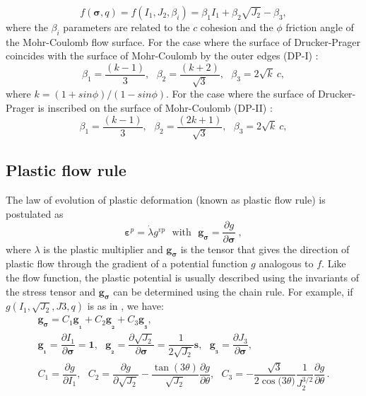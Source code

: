 \documentclass[Journal,letterpaper]{ascelike-new}
\newcommand{\dgds}{\boldsymbol{g_\sigma}}
\newcommand{\gvp}{g^{vp}}
\newcommand{\gllum}{\boldsymbol {g_{_1}}}
\newcommand{\glldois}{\boldsymbol {g_{_2}}}
\newcommand{\glltres}{\boldsymbol {g_{_3}}}
\newcommand{\onell}{\boldsymbol{1}}
\newcommand{\sll}{\boldsymbol{s}}
\newcommand{\strainp}{\boldsymbol{\varepsilon}^{p}}
\newcommand{\stress}{\boldsymbol{\sigma}}
\begin{document}
\begin{equation}
	\label{eq:f_Drucker_Prager}
	f(\stress,q) = f(I_1,J_2,\beta_i) = \beta_1 I_1 +\beta_2 \sqrt{J_2}-\beta_3,
\end{equation}
where the $\beta_i$ parameters are related to the $c$ cohesion and the $\phi$ friction angle of the Mohr-Coulomb flow surface. For the case where the surface of Drucker-Prager coincides with the surface of Mohr-Coulomb by the outer edges (DP-I) \cite{bernaud1991}:
\begin{equation}
	\label{eq:f_DP_circunscrita_MC}
	\beta_1 = \dfrac{(k-1)}{3}, ~~~ \beta_2 = \dfrac{(k+2)}{\sqrt{3}}, ~~~
	\beta_3 = 2\sqrt{k}~c,
\end{equation}
where $k = (1+sin{\phi})/(1-sin{\phi})$. For the case where the surface of Drucker-Prager is inscribed on the surface of Mohr-Coulomb (DP-II) \cite{bernaud1991}:
\begin{equation}
	\label{eq:f_DP_inscrita_MC}
	\beta_1 = \dfrac{(k-1)}{3}, ~~~ \beta_2 = \dfrac{(2k+1)}{\sqrt{3}}, ~~~
	\beta_3 = 2\sqrt{k}~c,
\end{equation}

\subsection{Plastic flow rule}

The law of evolution of plastic deformation (known as plastic flow rule) is postulated as
\begin{equation} \label{eq_plastic_flow}
	\strainp = \dot \lambda \gvp ~~~ \text{with} ~~~ \dgds = \dfrac{\partial g}{\partial \stress} \;,
\end{equation}
where $\lambda$ is the plastic multiplier and $\dgds$ is the tensor that gives the direction of plastic flow through the gradient of a potential function $g$ analogous to $f$. Like the flow function, the plastic potential is usually described using the invariants of the stress tensor and $\dgds$ can be determined using the chain rule. For example, if $g(I_1,\sqrt{J_2},J3,q)$ is as in , we have:
\begin{equation} \label{eq_direction_plastic_flow}
	\begin{array}{lcl}
	\dgds = C_1\gllum + C_2\glldois + C_3\glltres, \\ 
	\gllum = \dfrac{\partial I_1}{\partial \stress} = \onell,~~~ \glldois = \dfrac{\partial \sqrt{J_2}}{\partial \stress} = \dfrac{1}{2\sqrt{J_2}}\sll,~~~ \glltres = \dfrac{\partial J_3}{\partial \stress}, \\
	C_1 = \dfrac{\partial g}{\partial I_1},~~~C_2=\dfrac{\partial g}{\partial \sqrt{J_2}}-\dfrac{\tan{(3\theta)}}{\sqrt{J_2}}\dfrac{\partial g}{\partial \theta},~~~C_3 = -\dfrac{\sqrt{3}}{2\cos{(3\theta})}\dfrac{1}{J_2^{3/2}}\dfrac{\partial g}{\partial \theta} \,.
\end{array}
\end{equation}
\end{document}
